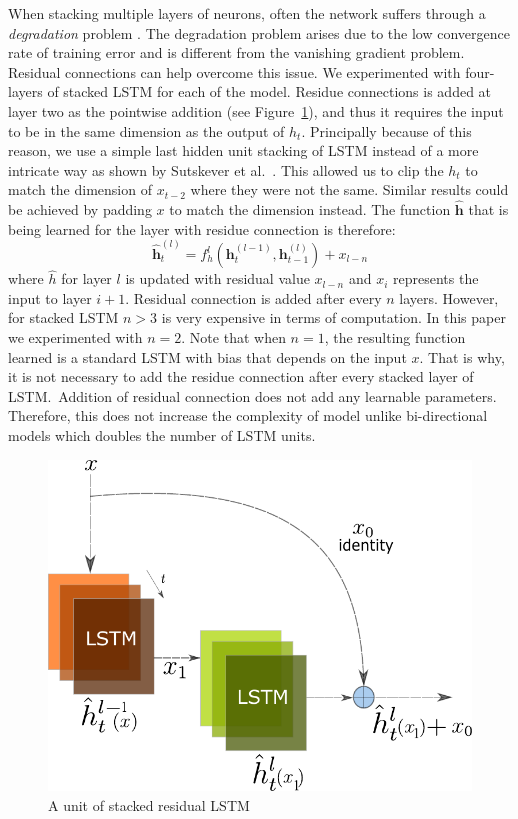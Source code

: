 When stacking multiple layers of neurons, often the network suffers through a \emph{degradation} problem \cite{he2015deep}. The degradation problem arises due to the low convergence rate of training error and is different from the vanishing gradient problem. Residual connections can help overcome this issue. We experimented with four-layers of stacked LSTM for each of the model. Residue connections is added at layer two as the pointwise addition (see Figure~\ref{fig:res}), and thus it requires the input to be in the same dimension as the output of $h_t$. Principally because of this reason, we use a simple last hidden unit stacking of LSTM instead of a more intricate way as shown by Sutskever et al.~\cite{SutskeverVL14}. This allowed us to clip the $h_t$ to match the dimension of $x_{t-2}$ where they were not the same. Similar results could be achieved by padding $x$ to match the dimension instead. The function $\bm{\hat{h}}$ that is being learned for the layer with residue connection is therefore:
$$
\bm{\hat{h}}_{t}^{(l)} = f_{h}^{l}(\bm{h}_{t}^{(l-1)}, \bm{h}_{t-1}^{(l)}) + x_{l-n}
$$
where $\hat{h}$ for layer $l$ is updated with residual value $x_{l-n} $ and $x_{i}$ represents the input to layer $i+1$. Residual connection is added after every $n$ layers. However, for stacked LSTM $n>3$ is very expensive in terms of computation. In this paper we experimented with $n=2$. Note that when $n=1$, the resulting function learned is a standard LSTM with bias that depends on the input $x$. That is why, it is not necessary to add the residue connection after every stacked layer of LSTM.\ Addition of residual connection does not add any learnable parameters. Therefore, this does not increase the complexity of model unlike bi-directional models which doubles the number of LSTM units.
\begin{figure}
    \centering
    \includegraphics[scale=0.8]{figures/paraphrase/reslstm.pdf}
    \caption[Residual LSTM]{A unit of stacked residual LSTM}
    \label{fig:res}
\end{figure}
 
